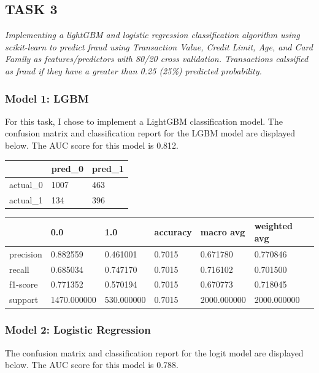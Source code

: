 \documentclass[
  letterpaper,
  DIV=11,
  numbers=noendperiod]{scrartcl}
\begin{document}
\subsection{TASK 3}\label{task-3}

\emph{Implementing a lightGBM and logistic regression classification
algorithm using scikit-learn to predict fraud using Transaction Value,
Credit Limit, Age, and Card Family as features/predictors with 80/20
cross validation. Transactions calssified as fraud if they have a
greater than 0.25 (25\%) predicted probability.}

\subsubsection{Model 1: LGBM}\label{model-1-lgbm}

For this task, I chose to implement a LightGBM classification model. The
confusion matrix and classification report for the LGBM model are
displayed below. The AUC score for this model is 0.812.

\begin{longtable}[]{@{}lll@{}}
\toprule\noalign{}
& pred\_0 & pred\_1 \\
\midrule\noalign{}
\endhead
\bottomrule\noalign{}
\endlastfoot
actual\_0 & 1007 & 463 \\
actual\_1 & 134 & 396 \\
\end{longtable}

\begin{longtable}[]{@{}llllll@{}}
\toprule\noalign{}
& 0.0 & 1.0 & accuracy & macro avg & weighted avg \\
\midrule\noalign{}
\endhead
\bottomrule\noalign{}
\endlastfoot
precision & 0.882559 & 0.461001 & 0.7015 & 0.671780 & 0.770846 \\
recall & 0.685034 & 0.747170 & 0.7015 & 0.716102 & 0.701500 \\
f1-score & 0.771352 & 0.570194 & 0.7015 & 0.670773 & 0.718045 \\
support & 1470.000000 & 530.000000 & 0.7015 & 2000.000000 &
2000.000000 \\
\end{longtable}

\subsubsection{Model 2: Logistic
Regression}\label{model-2-logistic-regression}

The confusion matrix and classification report for the logit model are
displayed below. The AUC score for this model is 0.788.
\end{document}
